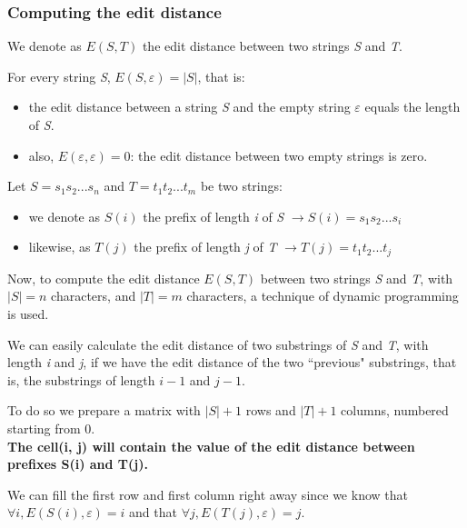\documentclass[../main.tex]{subfiles}
\begin{document}
\subsubsection{Computing the edit distance}

We denote as $E(S, T)$ the edit distance between two strings \emph{S} and \emph{T}.

For every string \emph{S}, $E(S, \varepsilon) = |S|$, that is:
\begin{itemize}
	\item the edit distance between a string \emph{S} and the empty string $\varepsilon$ equals the length of \emph{S}.
	\item also, $E(\varepsilon, \varepsilon)=0$: the edit distance between two empty strings is zero.
\end{itemize}

Let $S = s_1s_2...s_n$ and $T = t_1t_2...t_m$ be two strings:
\begin{itemize}
	\item we denote as $S(i)$ the prefix of length \emph{i} of \emph{S} $\rightarrow S(i) = s_1s_2...s_i$
	\item likewise, as $T(j)$ the prefix of length \emph{j} of \emph{T} $\rightarrow T(j) = t_1t_2...t_j$
\end{itemize}
\newpage

Now, to compute the edit distance $E(S, T)$ between two strings \emph{S} and \emph{T}, with $|S| = n$ characters, and $|T|=m$ characters, a technique of dynamic programming is used.

We can easily calculate the edit distance of two substrings of \emph{S} and \emph{T}, with length \emph{i} and \emph{j}, if we have the edit distance of the two ``previous" substrings, that is, the substrings of length $i-1$ and $j-1$.

To do so we prepare a matrix with $|S| + 1$ rows and $|T| + 1$ columns, numbered starting from 0.\\

\textbf{The cell(i, j) will contain the value of the edit distance between prefixes S(i) and T(j).}

We can fill the first row and first column right away since we know that $\forall i, E(S(i), \varepsilon) = i$ and that $\forall j, E(T(j), \varepsilon) = j$.
\end{document}
